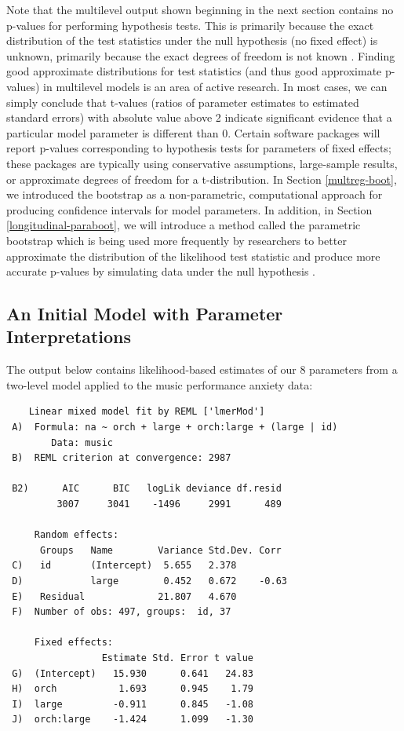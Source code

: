 \documentclass[
]{krantz}
\begin{document}
Note that the multilevel output shown beginning in the next section contains no p-values for performing hypothesis tests. This is primarily because the exact distribution of the test statistics under the null hypothesis (no fixed effect) is unknown, primarily because the exact degrees of freedom is not known \citep{Bates2015}. Finding good approximate distributions for test statistics (and thus good approximate p-values) in multilevel models is an area of active research. In most cases, we can simply conclude that t-values (ratios of parameter estimates to estimated standard errors) with absolute value above 2 indicate significant evidence that a particular model parameter is different than 0. Certain software packages will report p-values corresponding to hypothesis tests for parameters of fixed effects; these packages are typically using conservative assumptions, large-sample results, or approximate degrees of freedom for a t-distribution. In Section \ref{multreg-boot}, we introduced the bootstrap as a non-parametric, computational approach for producing confidence intervals for model parameters. In addition, in Section \ref{longitudinal-paraboot}, we will introduce a method called the parametric bootstrap which is being used more frequently by researchers to better approximate the distribution of the likelihood test statistic and produce more accurate p-values by simulating data under the null hypothesis \citep{Efron2012}.

\hypertarget{initialmodel}{%
\subsection{An Initial Model with Parameter Interpretations}\label{initialmodel}}

The output below contains likelihood-based estimates of our 8 parameters from a two-level model applied to the music performance anxiety data:

\begin{verbatim}
    Linear mixed model fit by REML ['lmerMod'] 
 A)  Formula: na ~ orch + large + orch:large + (large | id) 
        Data: music 
 B)  REML criterion at convergence: 2987 
      
 B2)      AIC      BIC   logLik deviance df.resid  
         3007     3041    -1496     2991      489  
      
     Random effects: 
      Groups   Name        Variance Std.Dev. Corr  
 C)   id       (Intercept)  5.655   2.378          
 D)            large        0.452   0.672    -0.63 
 E)   Residual             21.807   4.670          
 F)  Number of obs: 497, groups:  id, 37 
      
     Fixed effects: 
                 Estimate Std. Error t value 
 G)  (Intercept)   15.930      0.641   24.83 
 H)  orch           1.693      0.945    1.79 
 I)  large         -0.911      0.845   -1.08 
 J)  orch:large    -1.424      1.099   -1.30
\end{verbatim}
\end{document}

